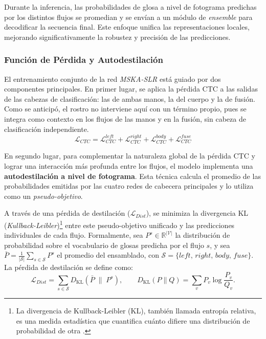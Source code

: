 Durante la inferencia, las probabilidades de glosa a nivel de fotograma predichas por los distintos flujos se promedian y se envían a un módulo de \textit{ensemble} para decodificar la secuencia final.
Este enfoque unifica las representaciones locales, mejorando significativamente la robustez y precisión de las predicciones.

\subsubsection{Función de Pérdida y Autodestilación}
El entrenamiento conjunto de la red \textit{MSKA-SLR} está guiado por dos componentes principales.
En primer lugar, se aplica la pérdida CTC a las salidas de las cabezas de clasificación: las de ambas manos, la del cuerpo y la de fusión.
Como se anticipó, el rostro no interviene aquí con un término propio, pues se integra como contexto en los flujos de las manos y en la fusión, sin cabeza de clasificación independiente.
\begin{equation*}
    \mathcal{L}_{CTC} = \mathcal{L}_{CTC}^{left} + \mathcal{L}_{CTC}^{right} + \mathcal{L}_{CTC}^{body} + \mathcal{L}_{CTC}^{fuse}
\end{equation*}

En segundo lugar, para complementar la naturaleza global de la pérdida CTC y lograr una interacción más profunda entre los flujos, el modelo implementa una \textbf{autodestilación a nivel de fotograma}.
Esta técnica calcula el promedio de las probabilidades emitidas por las cuatro redes de cabecera principales y lo utiliza como un \textit{pseudo-objetivo}.

A través de una pérdida de destilación ($\mathcal{L}_{Dist}$), se minimiza la divergencia KL (\textit{Kullback-Leibler})\footnote{La divergencia de Kullback-Leibler (KL), también llamada entropía relativa, es una medida estadística que cuantifica cuánto difiere una distribución de probabilidad de otra \cite{klDivergence}.} entre este pseudo-objetivo unificado y las predicciones individuales de cada flujo.
Formalmente, sea $P^s \in \mathbb{R}^{|\mathcal{V}|}$ la distribución de probabilidad sobre el vocabulario de glosas predicha por el flujo $s$, y sea $\bar{P} = \frac{1}{|\mathcal{S}|}\sum_{s \in \mathcal{S}} P^{s}$ el promedio del ensamblado, con $\mathcal{S} = \{left,\, right,\, body,\, fuse\}$.
La pérdida de destilación se define como:
\begin{equation*}
    \mathcal{L}_{Dist}
    = \sum_{s \in \mathcal{S}}
      D_{\mathrm{KL}}\!\left(\bar{P} \;\Big\|\; P^{s}\right), %
    \qquad
    D_{\mathrm{KL}}(P \| Q)
    = \sum_{v} P_{v} \log \frac{P_{v}}{Q_{v}}.
\end{equation*}


